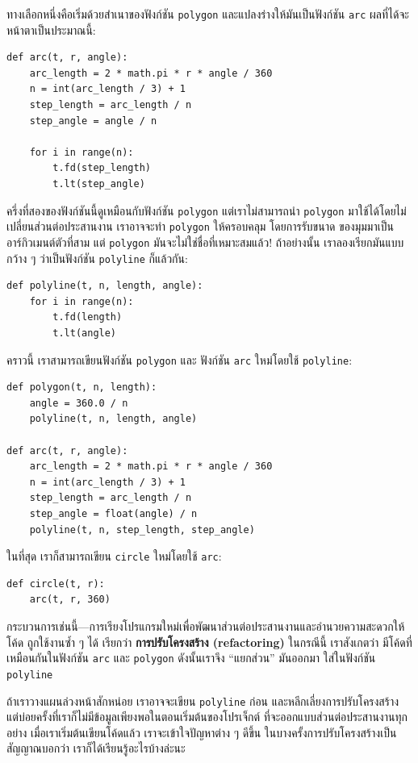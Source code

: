ทางเลือกหนึ่งคือเริ่มด้วยสำเนาของฟังก์ชัน {\tt polygon} และแปลงร่างให้มันเป็นฟังก์ชัน {\tt arc}
ผลที่ได้จะหน้าตาเป็นประมาณนี้:

\begin{verbatim}
def arc(t, r, angle):
    arc_length = 2 * math.pi * r * angle / 360
    n = int(arc_length / 3) + 1
    step_length = arc_length / n
    step_angle = angle / n
    
    for i in range(n):
        t.fd(step_length)
        t.lt(step_angle)
\end{verbatim}
%
ครึ่งที่สองของฟังก์ชันนี้ดูเหมือนกับฟังก์ชัน {\tt polygon} แต่เราไม่สามารถนำ {\tt polygon} 
มาใช้ได้โดยไม่เปลี่ยนส่วนต่อประสานงาน เราอาจจะทำ {\tt polygon} ให้ครอบคลุม โดยการรับขนาด
ของมุมมาเป็นอาร์กิวเมนต์ตัวที่สาม แต่ {\tt polygon} มันจะไม่ใช่ชื่อที่เหมาะสมแล้ว! ถ้าอย่างนั้น 
เราลองเรียกมันแบบกว้าง ๆ ว่าเป็นฟังก์ชัน {\tt polyline} ก็แล้วกัน: 

\begin{verbatim}
def polyline(t, n, length, angle):
    for i in range(n):
        t.fd(length)
        t.lt(angle)
\end{verbatim}
%
คราวนี้ เราสามารถเขียนฟังก์ชัน {\tt polygon} และ ฟังก์ชัน {\tt arc} ใหม่โดยใช้ {\tt polyline}:

\begin{verbatim}
def polygon(t, n, length):
    angle = 360.0 / n
    polyline(t, n, length, angle)

def arc(t, r, angle):
    arc_length = 2 * math.pi * r * angle / 360
    n = int(arc_length / 3) + 1
    step_length = arc_length / n
    step_angle = float(angle) / n
    polyline(t, n, step_length, step_angle)
\end{verbatim}
%
ในที่สุด เราก็สามารถเขียน {\tt circle} ใหม่โดยใช้ {\tt arc}:

\begin{verbatim}
def circle(t, r):
    arc(t, r, 360)
\end{verbatim}
%
กระบวนการเช่นนี้---การเรียงโปรแกรมใหม่เพื่อพัฒนาส่วนต่อประสานงานและอำนวยความสะดวกให้โค้ด
ถูกใช้งานซ้ำ ๆ ได้ เรียกว่า {\bf การปรับโครงสร้าง (refactoring)}  ในกรณีนี้ เราสังเกตว่า
มีโค้ดที่เหมือนกันในฟังก์ชัน {\tt arc} และ {\tt polygon} ดังนั้นเราจึง ``แยกส่วน'' มันออกมา
ใส่ในฟังก์ชัน {\tt polyline}

ถ้าเราวางแผนล่วงหน้าสักหน่อย เราอาจจะเขียน {\tt polyline} ก่อน และหลีกเลี่ยงการปรับโครงสร้าง
แต่บ่อยครั้งที่เราก็ไม่มีข้อมูลเพียงพอในตอนเริ่มต้นของโปรเจ็กต์ ที่จะออกแบบส่วนต่อประสานงานทุกอย่าง
เมื่อเราเริ่มต้นเขียนโค้ดแล้ว เราจะเข้าใจปัญหาต่าง ๆ ดีขึ้น ในบางครั้งการปรับโครงสร้างเป็นสัญญาณบอกว่า
เราก็ได้เรียนรู้อะไรบ้างล่ะนะ


